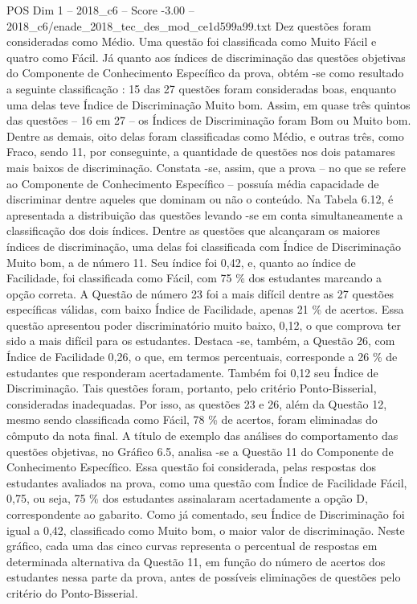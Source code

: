 \begin{textsample}{POS Dim 1 – 2018\_c6 – Score -3.00 – 2018\_c6/enade\_2018\_tec\_des\_mod\_ce1d599a99.txt}
Dez questões foram consideradas como Médio.
Uma questão foi classificada como Muito Fácil e quatro como Fácil.
Já quanto aos índices de discriminação das questões objetivas do Componente de Conhecimento Específico da prova, obtém -se como resultado a seguinte classificação : 15 das 27 questões foram consideradas boas, enquanto uma delas teve Índice de Discriminação Muito bom.
Assim, em quase três quintos das questões – 16 em 27 – os Índices de Discriminação foram Bom ou Muito bom.
Dentre as demais, oito delas foram classificadas como Médio, e outras três, como Fraco, sendo 11, por conseguinte, a quantidade de questões nos dois patamares mais baixos de discriminação.
Constata -se, assim, que a prova – no que se refere ao Componente de Conhecimento Específico – possuía média capacidade de discriminar dentre aqueles que dominam ou não o conteúdo.
Na Tabela 6.12, é apresentada a distribuição das questões levando -se em conta simultaneamente a classificação dos dois índices.
Dentre as questões que alcançaram os maiores índices de discriminação, uma delas foi classificada com Índice de Discriminação Muito bom, a de número 11.
Seu índice foi 0,42, e, quanto ao índice de Facilidade, foi classificada como Fácil, com 75 \% dos estudantes marcando a opção correta.
A Questão de número 23 foi a mais difícil dentre as 27 questões específicas válidas, com baixo Índice de Facilidade, apenas 21 \% de acertos.
Essa questão apresentou poder discriminatório muito baixo, 0,12, o que comprova ter sido a mais difícil para os estudantes.
Destaca -se, também, a Questão 26, com Índice de Facilidade 0,26, o que, em termos percentuais, corresponde a 26 \% de estudantes que responderam acertadamente.
Também foi 0,12 seu Índice de Discriminação.
Tais questões foram, portanto, pelo critério Ponto-Bisserial, consideradas inadequadas.
Por isso, as questões 23 e 26, além da Questão 12, mesmo sendo classificada como Fácil, 78 \% de acertos, foram eliminadas do cômputo da nota final.
A título de exemplo das análises do comportamento das questões objetivas, no Gráfico 6.5, analisa -se a Questão 11 do Componente de Conhecimento Específico.
Essa questão foi considerada, pelas respostas dos estudantes avaliados na prova, como uma questão com Índice de Facilidade Fácil, 0,75, ou seja, 75 \% dos estudantes assinalaram acertadamente a opção D, correspondente ao gabarito.
Como já comentado, seu Índice de Discriminação foi igual a 0,42, classificado como Muito bom, o maior valor de discriminação.
Neste gráfico, cada uma das cinco curvas representa o percentual de respostas em determinada alternativa da Questão 11, em função do número de acertos dos estudantes nessa parte da prova, antes de possíveis eliminações de questões pelo critério do Ponto-Bisserial.

\end{textsample}
